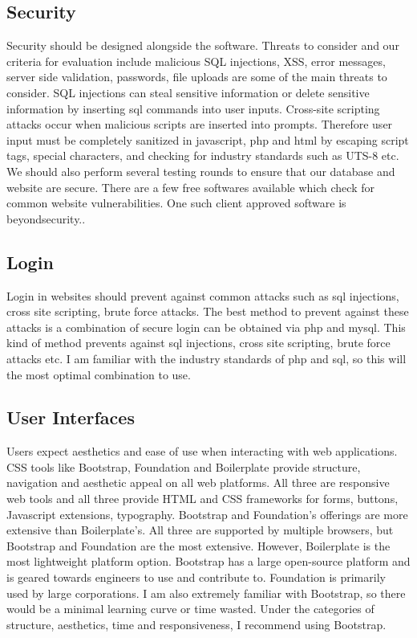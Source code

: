 \documentclass[letterpaper,10pt,titlepage,journal,compsoc,draftclsnofoot,onecolumn]{IEEEtran}
\begin{document}
\subsection{Security}

Security should be designed alongside the software. Threats to consider and our criteria for evaluation include malicious SQL injections, XSS, error messages, server side validation, passwords, file uploads are some of the main threats to consider. SQL injections can steal sensitive information or delete sensitive information by inserting sql commands into user inputs. Cross-site scripting attacks occur when malicious scripts are inserted into prompts. Therefore user input must be completely sanitized in javascript, php and html by escaping script tags, special characters, and checking for industry standards such as UTS-8 etc. We should also perform several testing rounds to ensure that our database and website are secure. There are a few free softwares available which check for common website vulnerabilities. One such client approved software is beyondsecurity..

\subsection{Login}

Login in websites should prevent against common attacks such as sql injections, cross site scripting, brute force attacks. The best method to prevent against these attacks is a combination of secure login can be obtained via php and mysql. This kind of method prevents against sql injections, cross site scripting, brute force attacks etc. I am familiar with the industry standards of php and sql, so this will the most optimal combination to use.
\subsection{User Interfaces}

Users expect aesthetics and ease of use when interacting with web applications. CSS tools like Bootstrap, Foundation and Boilerplate provide structure, navigation and aesthetic appeal on all web platforms. All three are responsive web tools and all three provide HTML and CSS frameworks for forms, buttons, Javascript extensions, typography. Bootstrap and Foundation's offerings are more extensive than Boilerplate's. All three are supported by multiple browsers, but Bootstrap and Foundation are the most extensive. However, Boilerplate is the most lightweight platform option. Bootstrap has a large open-source platform and is geared towards engineers to use and contribute to. Foundation is primarily used by large corporations. I am also extremely familiar with Bootstrap, so there would be a minimal learning curve or time wasted. Under the categories of structure, aesthetics, time and responsiveness, I recommend using Bootstrap. 
\end{document}
